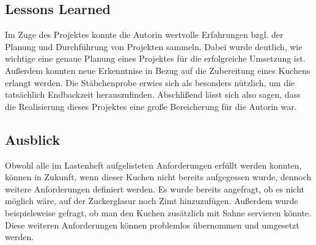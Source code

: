 \subsection{Lessons Learned}
Im Zuge des Projektes konnte die Autorin wertvolle Erfahrungen bzgl. der Planung und Durchführung von Projekten sammeln.
Dabei wurde deutlich, wie wichtige eine genaue Planung eines Projektes für die erfolgreiche Umsetzung ist. Außerdem konnten neue Erkenntnise in Bezug auf die Zubereitung eines Kuchens erlangt werden.
Die Stäbchenprobe erwies sich als besonders nützlich, um die tatsächlich Endbackzeit herauszufinden. Abschlißend lässt sich also sagen, dass die Realisierung dieses Projektes eine große Bereicherung für die Autorin war.
\subsection{Ausblick}
Obwohl alle im Lastenheft aufgelisteten Anforderungen erfüllt werden konnten, können in Zukunft, wenn dieser Kuchen nicht bereits aufgegessen wurde, dennoch weitere Anforderungen definiert werden. Es wurde bereits angefragt, ob es nicht möglich wäre, auf der Zuckerglasur noch Zimt hinzuzufügen. 
Außerdem wurde beispielsweise gefragt, ob man den Kuchen zusätzlich mit Sahne servieren könnte. Diese weiteren Anforderungen können problemlos übernommen und umgesetzt werden.
